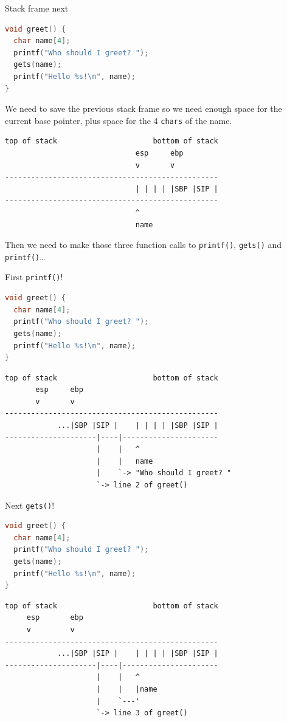 \documentclass[9pt,aspectratio=169]{beamer}
\begin{document}
\begin{frame}[label={sec:org1211124},fragile]{Stack frame next}
 \begin{lstlisting}[language=C,numbers=none]
void greet() {
  char name[4];
  printf("Who should I greet? ");
  gets(name);
  printf("Hello %s!\n", name);
}
\end{lstlisting}

We need to save the previous stack frame so we need enough space for the current base pointer, plus space for the 4 \texttt{chars} of the name.

\begin{verbatim}
top of stack                      bottom of stack
                              esp     ebp
                              v       v
-------------------------------------------------
                              | | | | |SBP |SIP |
-------------------------------------------------
                              ^
                              name
\end{verbatim}

Then we need to make those three function calls to \texttt{printf()}, \texttt{gets()} and \texttt{printf()}\ldots{}
\end{frame}
\begin{frame}[label={sec:org3228c1d},fragile]{First \texttt{printf()}!}
 \begin{lstlisting}[language=C,numbers=none]
void greet() {
  char name[4];
  printf("Who should I greet? ");
  gets(name);
  printf("Hello %s!\n", name);
}
\end{lstlisting}

\begin{verbatim}
top of stack                      bottom of stack
       esp     ebp
       v       v
-------------------------------------------------
            ...|SBP |SIP |    | | | | |SBP |SIP |
---------------------|----|----------------------
                     |    |   ^
                     |    |   name
                     |    `-> "Who should I greet? "
                     `-> line 2 of greet()
\end{verbatim}
\end{frame}
\begin{frame}[label={sec:org9c2711b},fragile]{Next \texttt{gets()}!}
 \begin{lstlisting}[language=C,numbers=none]
void greet() {
  char name[4];
  printf("Who should I greet? ");
  gets(name);
  printf("Hello %s!\n", name);
}
\end{lstlisting}

\begin{verbatim}
top of stack                      bottom of stack
     esp       ebp
     v         v
-------------------------------------------------
            ...|SBP |SIP |    | | | | |SBP |SIP |
---------------------|----|----------------------
                     |    |   ^
                     |    |   |name
                     |    `---'
                     `-> line 3 of greet()
\end{verbatim}
\end{frame}
\end{document}
